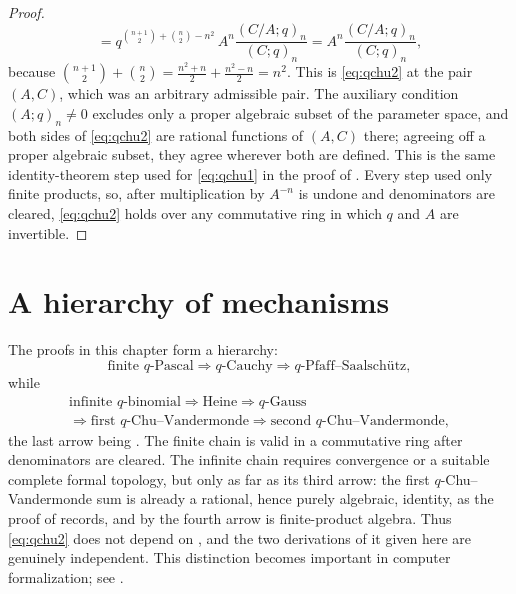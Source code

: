 \documentclass[11pt,a4paper,oneside,openany]{book}
\theoremstyle{definition}
\theoremstyle{remark}
\begin{document}
\begin{proof}
\[ =q^{\binom{n+1}{2}+\binom n2-n^2}\,A^{n}\frac{(C/A;q)_n}{(C;q)_n}
 =A^{n}\frac{(C/A;q)_n}{(C;q)_n},
\]
because $\binom{n+1}{2}+\binom n2=\tfrac{n^2+n}{2}+\tfrac{n^2-n}{2}=n^2$.  This is \eqref{eq:qchu2} at the pair $(A,C)$, which was an arbitrary admissible pair.  The auxiliary condition $(A;q)_n\ne0$ excludes only a proper algebraic
subset of the parameter space, and both sides of \eqref{eq:qchu2} are
rational functions of $(A,C)$ there; agreeing off a proper algebraic
subset, they agree wherever both are defined.  This is the same
identity-theorem step used for \eqref{eq:qchu1} in the proof of
.
Every step used only finite products, so, after multiplication by $A^{-n}$ is undone and denominators are cleared, \eqref{eq:qchu2} holds over any commutative ring in which $q$ and $A$ are invertible.
\end{proof}


\section{A hierarchy of mechanisms}

The proofs in this chapter form a hierarchy:
\[
 \text{finite $q$-Pascal}
 \Longrightarrow \text{$q$-Cauchy}
 \Longrightarrow \text{$q$-Pfaff--Saalsch\"utz},
\]
while
\[
\begin{gathered}
 \text{infinite $q$-binomial}
 \Longrightarrow \text{Heine}
 \Longrightarrow \text{$q$-Gauss}\\
 \Longrightarrow \text{first $q$-Chu--Vandermonde}
 \Longrightarrow \text{second $q$-Chu--Vandermonde},
\end{gathered}
\]
the last arrow being .  The finite chain is valid in a commutative ring after denominators are cleared.  The infinite chain requires convergence or a suitable complete formal topology, but only as far as its third arrow: the first $q$-Chu--Vandermonde sum is already a rational, hence purely algebraic, identity, as the proof of  records, and by  the fourth arrow is finite-product algebra.  Thus \eqref{eq:qchu2} does not depend on , and the two derivations of it given here are genuinely independent.  This distinction becomes important in computer formalization; see .
\end{document}
